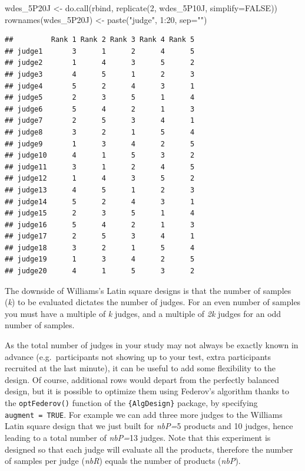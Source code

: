 \documentclass[
]{krantz}
\makeatletter
\newenvironment{Shaded}{\begin{snugshade}}{\end{snugshade}}
\newcommand{\AttributeTok}[1]{\textcolor[rgb]{0.61,0.61,0.61}{#1}}
\newcommand{\ConstantTok}[1]{\textcolor[rgb]{0,0,0}{#1}}
\newcommand{\DecValTok}[1]{\textcolor[rgb]{0.06,0.06,0.06}{#1}}
\newcommand{\FunctionTok}[1]{\textcolor[rgb]{0,0,0}{#1}}
\newcommand{\NormalTok}[1]{#1}
\newcommand{\OtherTok}[1]{\textcolor[rgb]{0.37,0.37,0.37}{#1}}
\newcommand{\SpecialCharTok}[1]{\textcolor[rgb]{0,0,0}{#1}}
\newcommand{\StringTok}[1]{\textcolor[rgb]{0.5,0.5,0.5}{#1}}
\newenvironment{kframe}{%
\medskip{}
\setlength{\fboxsep}{.8em}
 \def\at@end@of@kframe{}%
 \ifinner\ifhmode%
  \def\at@end@of@kframe{\end{minipage}}%
  \begin{minipage}{\columnwidth}%
 \fi\fi%
 \def\FrameCommand##1{\hskip\@totalleftmargin \hskip-\fboxsep
 \colorbox{shadecolor}{##1}\hskip-\fboxsep
     \hskip-\linewidth \hskip-\@totalleftmargin \hskip\columnwidth}%
 \MakeFramed {\advance\hsize-\width
   \@totalleftmargin\z@ \linewidth\hsize
   \@setminipage}}%
 {\par\unskip\endMakeFramed%
 \at@end@of@kframe}
\renewenvironment{Shaded}{\begin{kframe}}{\end{kframe}}
\makeatother
\begin{document}
\begin{Shaded}
\begin{Highlighting}[]
\NormalTok{wdes\_5P20J }\OtherTok{\textless{}{-}} \FunctionTok{do.call}\NormalTok{(rbind, }\FunctionTok{replicate}\NormalTok{(}\DecValTok{2}\NormalTok{, wdes\_5P10J, }\AttributeTok{simplify=}\ConstantTok{FALSE}\NormalTok{))}
\FunctionTok{rownames}\NormalTok{(wdes\_5P20J) }\OtherTok{\textless{}{-}} \FunctionTok{paste}\NormalTok{(}\StringTok{"judge"}\NormalTok{, }\DecValTok{1}\SpecialCharTok{:}\DecValTok{20}\NormalTok{, }\AttributeTok{sep=}\StringTok{""}\NormalTok{)}
\end{Highlighting}
\end{Shaded}

\begin{verbatim}
##         Rank 1 Rank 2 Rank 3 Rank 4 Rank 5
## judge1       3      1      2      4      5
## judge2       1      4      3      5      2
## judge3       4      5      1      2      3
## judge4       5      2      4      3      1
## judge5       2      3      5      1      4
## judge6       5      4      2      1      3
## judge7       2      5      3      4      1
## judge8       3      2      1      5      4
## judge9       1      3      4      2      5
## judge10      4      1      5      3      2
## judge11      3      1      2      4      5
## judge12      1      4      3      5      2
## judge13      4      5      1      2      3
## judge14      5      2      4      3      1
## judge15      2      3      5      1      4
## judge16      5      4      2      1      3
## judge17      2      5      3      4      1
## judge18      3      2      1      5      4
## judge19      1      3      4      2      5
## judge20      4      1      5      3      2
\end{verbatim}

The downside of Williams's Latin square designs is that the number of samples (\emph{k}) to be evaluated dictates the number of judges. For an even number of samples you must have a multiple of \emph{k} judges, and a multiple of \emph{2k} judges for an odd number of samples.

As the total number of judges in your study may not always be exactly known in advance (e.g.~participants not showing up to your test, extra participants recruited at the last minute), it can be useful to add some flexibility to the design. Of course, additional rows would depart from the perfectly balanced design, but it is possible to optimize them using Federov's algorithm thanks to the \texttt{optFederov()} function of the \texttt{\{AlgDesign\}} package, by specifying \texttt{augment\ =\ TRUE}. For example we can add three more judges to the Williams Latin square design that we just built for \emph{nbP=}5 products and 10 judges, hence leading to a total number of \emph{nbP=}13 judges. Note that this experiment is designed so that each judge will evaluate all the products, therefore the number of samples per judge (\emph{nbR}) equals the number of products (\emph{nbP}).
\end{document}
